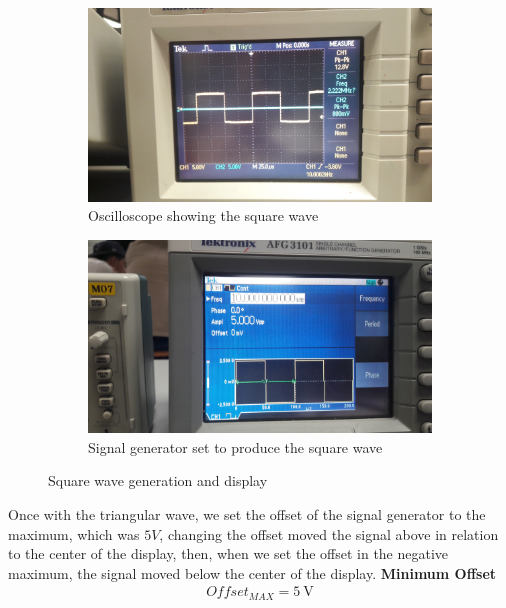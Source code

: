 \documentclass[letterpaper]{article}
\begin{document}
\begin{figure}[H]
    \begin{subfigure}{0.55\textwidth}
        \includegraphics[width=.95\linewidth]{img/part2/11}
        \caption{Oscilloscope showing the square wave}
    \end{subfigure}
    \begin{subfigure}{0.55\textwidth}
        \includegraphics[width=.95\linewidth]{img/part2/10}
        \caption{Signal generator set to produce the square wave}
    \end{subfigure}
    \caption{Square wave generation and display}
\end{figure}
Once with the triangular wave, we set the offset of the signal generator to the maximum, which
was $5 V$, changing the offset moved the signal above in relation to the center of the display, then, when
we set the offset in the negative maximum, the signal moved below the center of the display.\newpage
{\textbf{Minimum Offset}}
\begin{gather*}
    Offset_{MAX} = \SI{5}{\volt}
\end{gather*}
\end{document}
